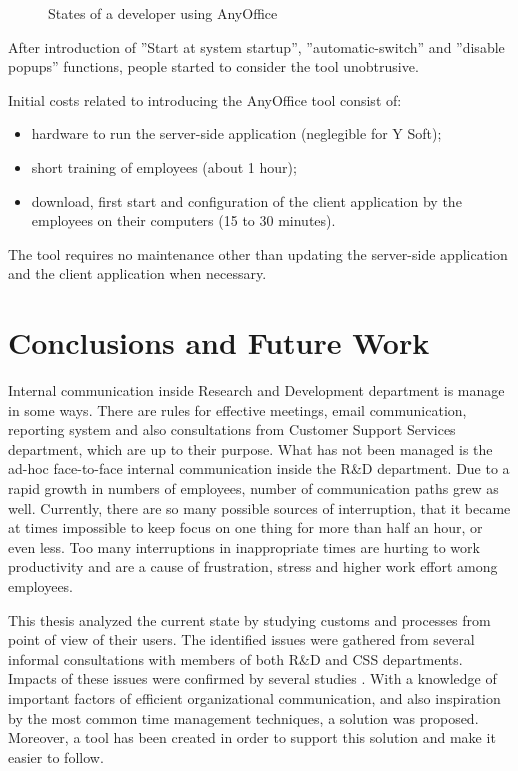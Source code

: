 \documentclass[11pt,singleside]{myfithesis2}
\newcommand{\pict}[4]{
	\begin{figure}[h!]
  		\vspace{-7px}
  		\centerline{\fcolorbox{darkgray}{palegray}{\texttt{[image: \#2]}}}
  		\caption{#1}
  		\label{#4}
	\end{figure}
}
\begin{document}
\pict{States of a developer using AnyOffice}{data/anyOfficeStatesFinal.png}{width=0.8\textwidth}{pic:anyOfficeStatesFinal}

After introduction of ''Start at system startup'', ''automatic-switch'' and ''disable popups'' functions, people started to consider the tool unobtrusive. 




Initial costs related to introducing the AnyOffice tool consist of:
\begin{itemize}
	\item{hardware to run the server-side application (neglegible for Y Soft);}
	\item{short training of employees (about 1 hour);}
	\item{download, first start and configuration of the client application by the employees on their computers (15 to 30 minutes).}
\end{itemize}
The tool requires no maintenance other than updating the server-side application and the client application when necessary. 

\chapter{Conclusions and Future Work}

Internal communication inside Research and Development department is manage in some ways. There are rules for effective meetings, email communication, reporting system and also consultations from Customer Support Services department, which are up to their purpose. What has not been managed is the ad-hoc face-to-face internal communication inside the R\&D department. Due to a rapid growth in numbers of employees, number of communication paths grew as well. Currently, there are so many possible sources of interruption, that it became at times impossible to keep focus on one thing for more than half an hour, or even less. Too many interruptions in inappropriate times are hurting to work productivity and are a cause of frustration, stress and higher work effort among employees.

This thesis analyzed the current state by studying customs and processes from point of view of their users. The identified issues were gathered from several informal consultations with members of both R\&D and CSS departments. Impacts of these issues were confirmed by several studies \cite{studySpeedAndStress, studyAttention, studyDealingWithInterruptions, studyResumptionStrategies}. With a knowledge of important factors of efficient organizational communication, and also inspiration by the most common time management techniques, a solution was proposed. Moreover, a tool has been created in order to support this solution and make it easier to follow.
\end{document}
